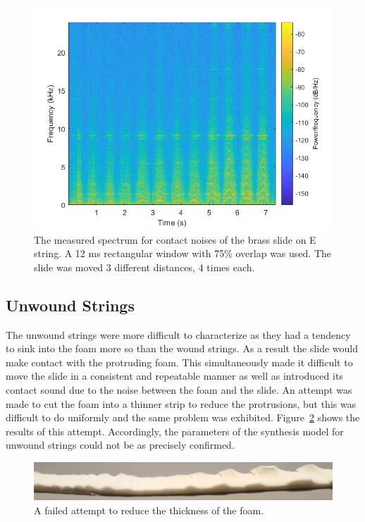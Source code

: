 \documentclass[../main.tex]{subfiles}
\begin{document}
\begin{figure}[h]
    \centering
    \includegraphics[scale=.65]{./images/plots/ContactNoiseEBrass.png}
    \caption{The measured spectrum for contact noises of the brass slide on E string. A 12 ms rectangular window with 75\% overlap was used. The slide was moved 3 different distances, 4 times each.}
    \label{fig:ContactNoiseEBrass}
\end{figure}

\subsection{Unwound Strings}
The unwound strings were more difficult to characterize as they had a tendency to sink into the foam more so than the wound strings. As a result the slide would make contact with the protruding foam. This simultaneously made it difficult to move the slide in a consistent and repeatable manner as well as introduced its contact sound due to the noise between the foam and the slide. An attempt was made to cut the foam into a thinner strip to reduce the protrusions, but this was difficult to do uniformly and the same problem was exhibited. Figure~\ref{fig:CutFoam} shows the results of this attempt. Accordingly, the parameters of the synthesis model for unwound strings could not be as precisely confirmed.

\begin{figure}[h]
    \centering
    \includegraphics[scale=1]{./images/pictures/CutFoam.png}
    \caption{A failed attempt to reduce the thickness of the foam.}
    \label{fig:CutFoam}
\end{figure}
\end{document}
